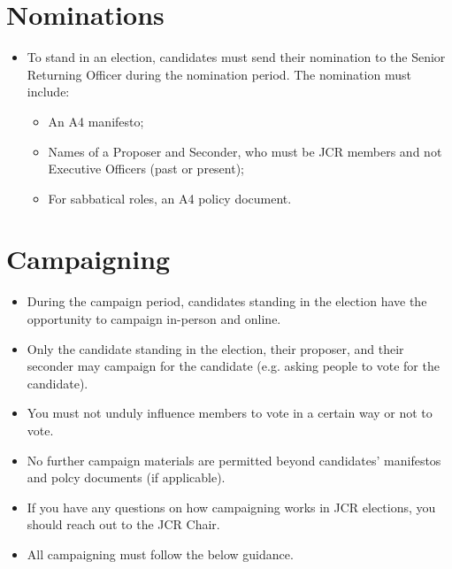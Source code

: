 \documentclass[12pt]{article}
\begin{document}
    \section{Nominations}
    \begin{itemize}
        \item To stand in an election, candidates must send their nomination to the Senior Returning Officer during the nomination period. The nomination must include:
        \begin{itemize}
            \item An A4 manifesto;
            \item Names of a Proposer and Seconder, who must be JCR members and not Executive Officers (past or present);
            \item For sabbatical roles, an A4 policy document.
        \end{itemize}
    \end{itemize}

    \section{Campaigning}
    \begin{itemize}
        \item During the campaign period, candidates standing in the election have the opportunity to campaign in-person and online.
        \item Only the candidate standing in the election, their proposer, and their seconder may campaign for the candidate (e.g. asking people to vote for the candidate).
        \item You must not unduly influence members to vote in a certain way or not to vote.
        \item No further campaign materials are permitted beyond candidates' manifestos and polcy documents (if applicable).
        \item If you have any questions on how campaigning works in JCR elections, you should reach out to the JCR Chair.
        \item All campaigning must follow the below guidance.
    \end{itemize}
\end{document}
